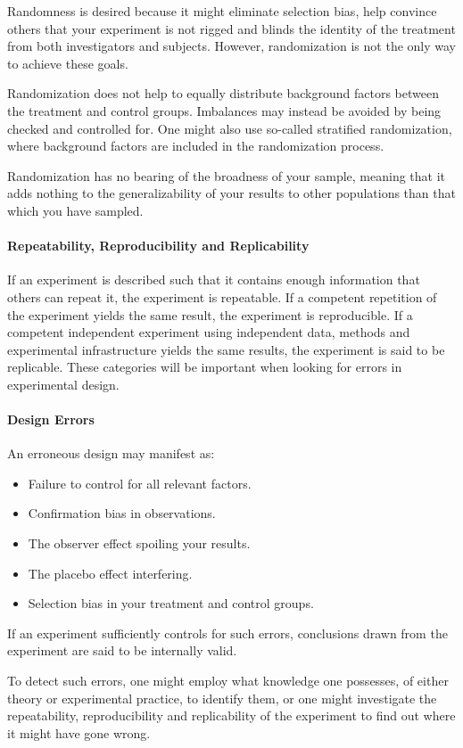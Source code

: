 Randomness is desired because it might eliminate selection bias, help convince others that your experiment is not rigged and blinds the identity of the treatment from both investigators and subjects. However, randomization is not the only way to achieve these goals.

Randomization does not help to equally distribute background factors between the treatment and control groups. Imbalances may instead be avoided by being checked and controlled for. One might also use so-called stratified randomization, where background factors are included in the randomization process.

Randomization has no bearing of the broadness of your sample, meaning that it adds nothing to the generalizability of your results to other populations than that which you have sampled.

\paragraph{Repeatability, Reproducibility and Replicability}
If an experiment is described such that it contains enough information that others can repeat it, the experiment is repeatable. If a competent repetition of the experiment yields the same result, the experiment is reproducible. If a competent independent experiment using independent data, methods and experimental infrastructure yields the same results, the experiment is said to be replicable. These categories will be important when looking for errors in experimental design.

\paragraph{Design Errors}
An erroneous design may manifest as:
\begin{itemize}
	\item Failure to control for all relevant factors.
	\item Confirmation bias in observations.
	\item The observer effect spoiling your results.
	\item The placebo effect interfering.
	\item Selection bias in your treatment and control groups.
\end{itemize}
If an experiment sufficiently controls for such errors, conclusions drawn from the experiment are said to be internally valid.

To detect such errors, one might employ what knowledge one possesses, of either theory or experimental practice, to identify them, or one might investigate the repeatability, reproducibility and replicability of the experiment to find out where it might have gone wrong.

